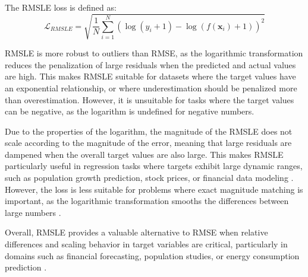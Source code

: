 \documentclass[sn-mathphys-num]{sn-jnl}%
\renewcommand\vec{\mathbf}
\begin{document}
The RMSLE loss is defined as:
\begin{equation}
    \mathcal{L}_{RMSLE} = \sqrt{\frac{1}{N} \sum_{i=1}^{N} \left ( \log(y_i+1) - \log(f(\vec{x}_i)+1) \right )^{2}}
    \label{eq:rmsle}
\end{equation}

RMSLE is more robust to outliers than RMSE, as the logarithmic transformation reduces the penalization of large residuals when the predicted and actual values are high. This makes RMSLE suitable for datasets where the target values have an exponential relationship, or where underestimation should be penalized more than overestimation. However, it is unsuitable for tasks where the target values can be negative, as the logarithm is undefined for negative numbers.

Due to the properties of the logarithm, the magnitude of the RMSLE does not scale according to the magnitude of the error, meaning that large residuals are dampened when the overall target values are also large. This makes RMSLE particularly useful in regression tasks where targets exhibit large dynamic ranges, such as population growth prediction, stock prices, or financial data modeling \cite{chicco2021advantages,regression_rmsle}. However, the loss is less suitable for problems where exact magnitude matching is important, as the logarithmic transformation smooths the differences between large numbers \cite{semeniuta2017handy}.

Overall, RMSLE provides a valuable alternative to RMSE when relative differences and scaling behavior in target variables are critical, particularly in domains such as financial forecasting, population studies, or energy consumption prediction \cite{wang2006log,breiman1997arcing,lin2020frequency}.
    
\end{document}
